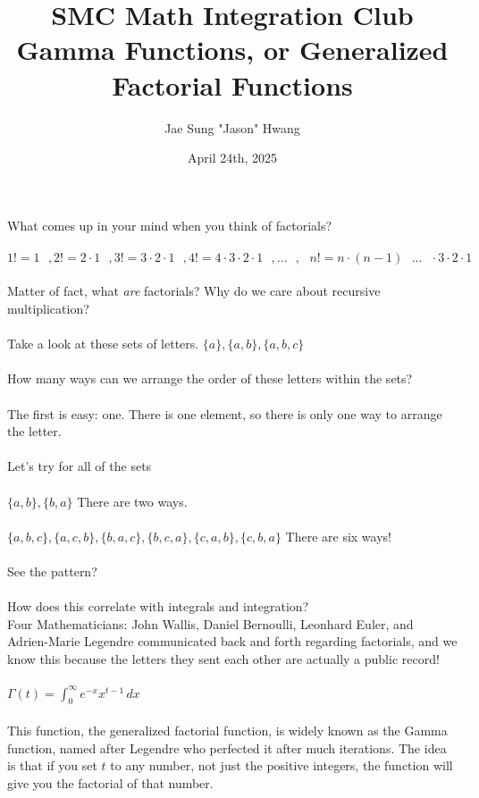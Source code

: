 \documentclass[11pt]{article}
\title{SMC Math Integration Club\\Gamma Functions, or Generalized Factorial Functions}
\author{Jae Sung "Jason" Hwang}
\date{April 24th, 2025}
\begin{document}
\maketitle

\newpage

{What comes up in your mind when you think of factorials?} \\
\\ ${1! = 1 \text{ }, 2! =2 \cdot 1\text{ }, 3! = 3 \cdot 2 \cdot 1\text{ }, 4! = 4 \cdot 3 \cdot 2 \cdot 1\text{ }, ...\text{ } ,\text{ } n! = n \cdot (n-1) \text{ } ... \text{ } \cdot 3 \cdot 2 \cdot 1\text{ }}$\\
\\ {Matter of fact, what \textit{are} factorials? Why do we care about recursive multiplication?} \\ 
\\ {Take a look at these sets of letters.} ${\{a\},\{a,b\},\{a,b,c\}}$ \\
\\ {How many ways can we arrange the order of these letters within the sets?} \\
\\ {The first is easy: one. There is one element, so there is only one way to arrange the letter.}\\
\\ {Let's try for all of the sets} \\
\\ ${\{a,b\},\{b,a\}}$ {There are two ways.}\\
\\ ${\{a,b,c\},\{a,c,b\},\{b,a,c\},\{b,c,a\},\{c,a,b\},\{c,b,a\}}$ {There are six ways!} \\
\\ {See the pattern?} \\
\\ {How does this correlate with integrals and integration?} \\
\newpage
{Four Mathematicians: John Wallis, Daniel Bernoulli, Leonhard Euler, and Adrien-Marie Legendre communicated back and forth regarding factorials, and we know this because the letters they sent each other are actually a public record!} \\
\\ ${\displaystyle \Gamma({t}) = \int _{0}^{\infty} e^{-x}x^{t-1} \,dx}$ \\
\\ {This function, the generalized factorial function, is widely known as the Gamma function, named after Legendre who perfected it after much iterations. The idea is that if you set } ${t}$ { to any number, not just the positive integers, the function will give you the factorial of that number.} \\
\end{document}
